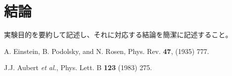 \documentclass[uplatex,dvipdfmx,a4j,12pt]{jsarticle}
\begin{document}
\section{結論}
実験目的を要約して記述し、それに対応する結論を簡潔に記述すること。


\begin{thebibliography}{9}

        A. Einstein, B. Podolsky, and N. Rosen, 
        Phys. Rev. \textbf{47}, (1935) 777.

        J.J. Aubert \textit{et al.},
        Phys. Lett. B \textbf{123} (1983) 275.
    
\end{thebibliography}
\end{document}
